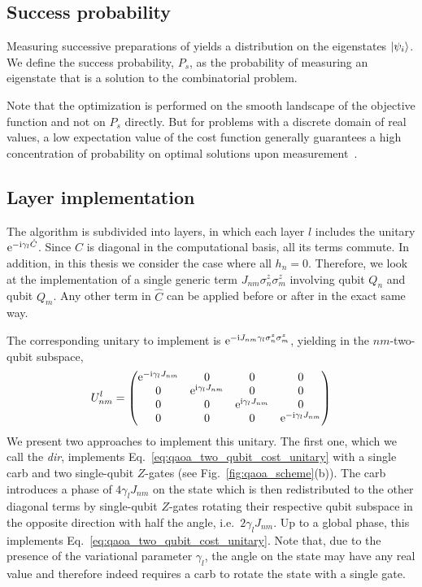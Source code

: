 \subsection{Success probability} \label{sec:qaoa_success_prob}
Measuring successive preparations of \optimalstate{} yields a distribution on the eigenstates $\ket{\psi_i}$.
We define the success probability, $P_s$, as the probability of measuring an eigenstate that is a solution to the combinatorial problem. 

Note that the optimization is performed on the smooth landscape of the objective function \cost{} and not on $P_s$ directly. But for problems with a discrete domain of real values, a low expectation value of the cost function generally guarantees a high concentration of probability on optimal solutions upon measurement~\cite{Cook2019TheCover, Wang2019XY-mixers:QAOA}.

\subsection{Layer implementation}
The algorithm is subdivided into layers, in which each layer $l$ includes the unitary $\mathrm e^{-\mathrm i\gamma_l\hat C}$. Since $\hat C$ is diagonal in the computational basis, all its terms commute. In addition, in this thesis we consider the case where all $h_n = 0$. Therefore, we look at the implementation of a single generic term $J_{nm}\sigma_n^z\sigma_m^z$ involving qubit $Q_n$ and qubit $Q_m$. Any other term in $\hat C$ can be applied before or after in the exact same way. 

The corresponding unitary to implement is $\mathrm e^{-\mathrm i J_{nm} \gamma_l \sigma_n^z\sigma_m^z}$, yielding in the $nm$-two-qubit subspace,
\begin{equation} \label{eq:qaoa_two_qubit_cost_unitary}
    U_{nm}^l = 
    \begin{pmatrix}
    \mathrm e^{-\mathrm i\gamma_l J_{nm}} & 0 & 0 & 0\\
    0 & \mathrm e^{\mathrm i\gamma_l J_{nm}} & 0 & 0 \\
    0 & 0 & \mathrm e^{\mathrm i\gamma_l J_{nm}} & 0 \\
    0 & 0 & 0 & \mathrm e^{-\mathrm i\gamma_l J_{nm}}
    \end{pmatrix}
\end{equation}{}
We present two approaches to implement this unitary. The first one, which we call the \textit{\gls{dir}}, implements Eq.~\eqref{eq:qaoa_two_qubit_cost_unitary} with a single \gls{carb} and two single-qubit $Z$-gates (see Fig.~\ref{fig:qaoa_scheme}(b)). The \gls{carb} introduces a phase of $4\gamma_l J_{nm}$ on the \oo{} state which is then redistributed to the other diagonal terms by single-qubit $Z$-gates rotating their respective qubit subspace in the opposite direction with half the angle, i.e.\ $2\gamma_l J_{nm}$. Up to a global phase, this implements Eq.~\eqref{eq:qaoa_two_qubit_cost_unitary}. Note that, due to the presence of the variational parameter $\gamma_l$, the angle on the \oo{} state may have any real value and therefore indeed requires a \gls{carb} to rotate the \oo{} state with a single gate.

